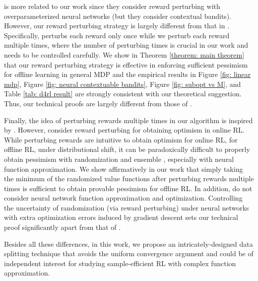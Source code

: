 \documentclass{article} \usepackage{iclr2023/iclr2023_conference,times}
\begin{document}
\citet{jia2022learning} is more related to our work since they consider reward perturbing with overparameterized neural networks (but they consider contextual bandits). However, our reward perturbing strategy is largely different from that in \cite{jia2022learning}. Specifically, \citet{jia2022learning} perturbs each reward only once while we perturb each reward multiple times, where the number of perturbing times is crucial in our work and needs to be controlled carefully. We show in Theorem \ref{theorem: main theorem} that our reward perturbing strategy is effective in enforcing sufficient pessimism for offline learning in general MDP and the empirical results in Figure \ref{fig: linear mdp}, Figure \ref{fig: neural contextuable bandits}, Figure \ref{fig: subopt vs M}, and Table \ref{tab: d4rl result} are strongly consistent with our theoretical suggestion. Thus, our technical proofs are largely different from those of \citet{jia2022learning}. 

Finally, the idea of perturbing rewards multiple times in our algorithm is inspired by \cite{ishfaq2021randomized}. However, \citet{ishfaq2021randomized} consider reward perturbing for obtaining optimism in online RL. While perturbing rewards are intuitive to obtain optimism for online RL, for offline RL, under distributional shift, it can be paradoxically difficult to properly obtain pessimism with randomization and ensemble \citep{ghasemipour2022so}, especially with neural function approximation. We show affirmatively in our work that simply taking the minimum of the randomized value functions after perturbing rewards multiple times is sufficient to obtain provable pessimism for offline RL. In addition, \citet{ishfaq2021randomized} do not consider neural network function approximation and optimization. Controlling the uncertainty of randomization (via reward perturbing) under neural networks with extra optimization errors induced by gradient descent sets our technical proof significantly apart from that of \cite{ishfaq2021randomized}. 

Besides all these differences, in this work, we propose an intricately-designed data splitting technique that avoids the uniform convergence argument and could be of independent interest for studying sample-efficient RL with complex function approximation.
\end{document}
